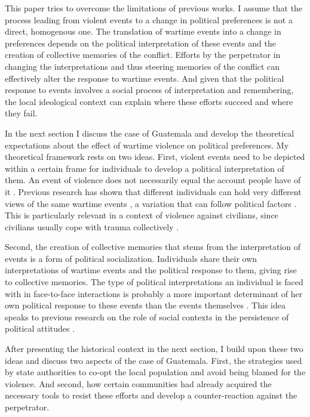 \documentclass[12pt, notitlepage]{article}
\begin{document}
This paper tries to overcome the limitations of previous works.
I assume that the process leading from violent events to a change in political preferences is not a direct, homogenous one.
The translation of wartime events into a change in preferences depends on the political interpretation of these events and the creation of collective memories of the conflict.
Efforts by the perpetrator in changing the interpretations and thus steering memories of the conflict can effectively alter the response to wartime events.
And given that the political response to events involves a social process of interpretation and remembering, the local ideological context can explain where these efforts succeed and where they fail.

In the next section I discuss the case of Guatemala and develop the theoretical expectations about the effect of wartime violence on political preferences.
My theoretical framework rests on two ideas.
First, violent events need to be depicted within a certain frame for individuals to develop a political interpretation of them.
An event of violence does not necessarily equal the account people have of it \citep{Basta:2018aa}.
Previous research has shown that different individuals can hold very different views of the same wartime events \citep{Driscoll:2016aa}, a variation that can follow political factors \citep{Silverman:2019aa}.
This is particularly relevant in a context of violence against civilians, since civilians usually cope with trauma collectively \citep{Lyons:1998aa}.

Second, the creation of collective memories that stems from the interpretation of events is a form of political socialization.
Individuals share their own interpretations of wartime events and the political response to them, giving rise to collective memories.
The type of political interpretations an individual is faced with in face-to-face interactions is probably a more important determinant of her own political response to these events than the events themselves \citep{Dyrstad:2012aa, Molina:2014aa, Glaurdic:2016aa}.
This idea speaks to previous research on the role of social contexts in the persistence of political attitudes \citep{Wittenberg:2006aa, Tavits:2013aa}.

After presenting the historical context in the next section, I build upon these two ideas and discuss two aspects of the case of Guatemala.
First, the strategies used by state authorities to co-opt the local population and avoid being blamed for the violence.
And second, how certain communities had already acquired the necessary tools to resist these efforts and develop a counter-reaction against the perpetrator.
\end{document}
